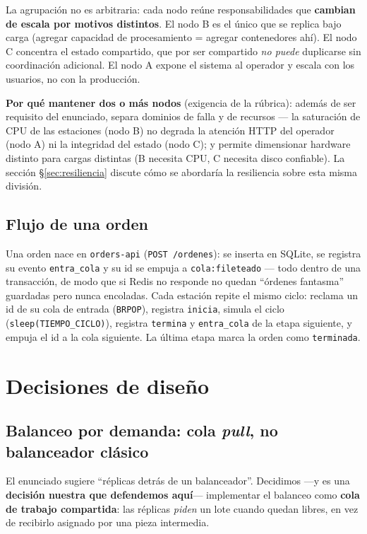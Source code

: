 \documentclass[12pt,a4paper]{article}
\begin{document}
La agrupación no es arbitraria: cada nodo reúne responsabilidades que
\textbf{cambian de escala por motivos distintos}. El nodo B es el único que se
replica bajo carga (agregar capacidad de procesamiento = agregar contenedores
ahí). El nodo C concentra el estado compartido, que por ser compartido
\emph{no puede} duplicarse sin coordinación adicional. El nodo A expone el
sistema al operador y escala con los usuarios, no con la producción.

\textbf{Por qué mantener dos o más nodos} (exigencia de la rúbrica): además de
ser requisito del enunciado, separa dominios de falla y de recursos — la
saturación de CPU de las estaciones (nodo B) no degrada la atención HTTP del
operador (nodo A) ni la integridad del estado (nodo C); y permite dimensionar
hardware distinto para cargas distintas (B necesita CPU, C necesita disco
confiable). La sección §\ref{sec:resiliencia} discute cómo se abordaría la
resiliencia sobre esta misma división.

\subsection{Flujo de una orden}

Una orden nace en \texttt{orders-api} (\texttt{POST /ordenes}): se inserta en
SQLite, se registra su evento \texttt{entra\_cola} y su id se empuja a
\texttt{cola:fileteado} — todo dentro de una transacción, de modo que si Redis
no responde no quedan ``órdenes fantasma'' guardadas pero nunca encoladas.
Cada estación repite el mismo ciclo: reclama un id de su cola de entrada
(\texttt{BRPOP}), registra \texttt{inicia}, simula el ciclo
(\texttt{sleep(TIEMPO\_CICLO)}), registra \texttt{termina} y
\texttt{entra\_cola} de la etapa siguiente, y empuja el id a la cola siguiente.
La última etapa marca la orden como \texttt{terminada}.

\section{Decisiones de diseño}

\subsection{Balanceo por demanda: cola \emph{pull}, no balanceador clásico}
\label{sec:pull}

El enunciado sugiere ``réplicas detrás de un balanceador''. Decidimos —y es una
\textbf{decisión nuestra que defendemos aquí}— implementar el balanceo como
\textbf{cola de trabajo compartida}: las réplicas \emph{piden} un lote cuando
quedan libres, en vez de recibirlo asignado por una pieza intermedia.
\end{document}
